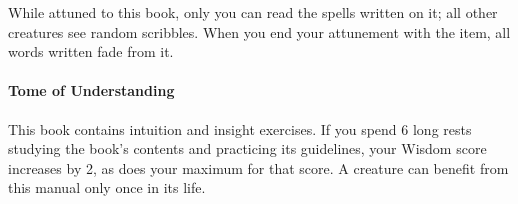         While attuned to this book, only you can read the spells written on it; all other creatures see random scribbles.
        When you end your attunement with the item, all words written fade from it.
    \paragraph{Tome of Understanding}
        This book contains intuition and insight exercises.
        If you spend 6 long rests studying the book's contents and practicing its guidelines, your Wisdom score increases by 2, as does your maximum for that score.
        A creature can benefit from this manual only once in its life.
